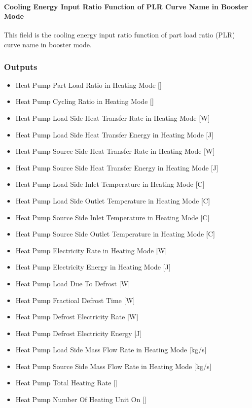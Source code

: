 \paragraph{Cooling Energy Input Ratio Function of PLR Curve Name in Booster
Mode} This field is the cooling energy input ratio function of part load ratio
(PLR) curve name in booster mode.

\subsubsection{Outputs}\label{outputs-heatpump-air-to-water}
\begin{itemize}
\item Heat Pump Part Load Ratio in Heating Mode {[}{]}
\item Heat Pump Cycling Ratio in Heating Mode {[}{]}
\item Heat Pump Load Side Heat Transfer Rate in Heating Mode {[}W{]}
\item Heat Pump Load Side Heat Transfer Energy in Heating Mode {[}J{]}
\item Heat Pump Source Side Heat Transfer Rate in Heating Mode {[}W{]}
\item Heat Pump Source Side Heat Transfer Energy in Heating Mode {[}J{]}
\item Heat Pump Load Side Inlet Temperature in Heating Mode {[}C{]}
\item Heat Pump Load Side Outlet Temperature in Heating Mode {[}C{]}
\item Heat Pump Source Side Inlet Temperature in Heating Mode {[}C{]}
\item Heat Pump Source Side Outlet Temperature in Heating Mode {[}C{]}
\item Heat Pump Electricity Rate in Heating Mode {[}W{]}
\item Heat Pump Electricity Energy in Heating Mode {[}J{]}
\item Heat Pump Load Due To Defrost {[}W{]}
\item Heat Pump Fractioal Defrost Time {[}W{]}
\item Heat Pump Defrost Electricity Rate {[}W{]}
\item Heat Pump Defrost Electricity Energy {[}J{]}
\item Heat Pump Load Side Mass Flow Rate in Heating Mode {[}kg/s{]}
\item Heat Pump Source Side Mass Flow Rate in Heating Mode {[}kg/s{]}
\item Heat Pump Total Heating Rate {[}{]}
\item Heat Pump Number Of Heating Unit On {[}{]}

\end{itemize}
